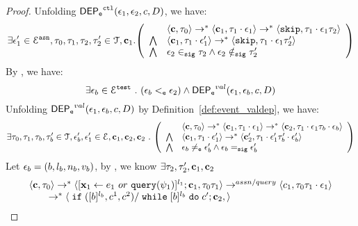 \begin{proof}
Unfolding $\mathsf{DEP_{\mathtt{e}}}^{\mathtt{{ctl}}}(\mathtt{\epsilon}_1, \mathtt{\epsilon}_2, c, D)$, we have:
\[
\exists \event_1' \in \eventset^{\asn}, \vtrace_0,
\vtrace_1, \vtrace_2, \vtrace_2' \in \mathcal{T}, \ssa{c}_1.
  \left(
  \begin{array}{ll}   
  & \config{\ssa{c}, \vtrace_0} \rightarrow^{*} 
    \config{\ssa{c}_1, \vtrace_1 \cdot \event_1}  \rightarrow^{*} 
    \config{\eskip,  \vtrace_1 \cdot \event_1 \vtrace_2} 
  \\ 
  \bigwedge &
  \config{\ssa{c}_1, \vtrace_1 \cdot \event_1'}  \rightarrow^{*} 
  \config{\eskip,  \vtrace_1 \cdot \event_1 \vtrace_2' } 
  \\
  \bigwedge &
  \event_2 \sigin \vtrace_2 \land \event_2 \notsigin \vtrace_2'
\end{array}
\right)
 \]
 By , we have:
 \[
   \exists \mathtt{\epsilon}_b\in \mathcal{E}^{\mathtt{{test}}} ~.~ (\mathtt{\epsilon}_b <_{\mathtt{e}} \mathtt{\epsilon}_2) \land \mathsf{DEP_{\mathtt{e}}}^{val}(\mathtt{\epsilon}_1, \mathtt{\epsilon}_b, c, D)
 \]
 Unfolding $\mathsf{DEP_{\mathtt{e}}}^{val}(\mathtt{\epsilon}_1, \mathtt{\epsilon}_b, c, D)$ by Definition~\ref{def:event_valdep}, we have:
\[
\exists \vtrace_0, \vtrace_1, \vtrace_b, \vtrace_b' \in \mathcal{T},  \event_b', \event_1' \in \eventset, 
\ssa{c}_1, \ssa{c}_2, \ssa{c}_2 \st
  \left(
  \begin{array}{ll}   
 & \config{\ssa{c}, \vtrace_0} \rightarrow^{*} 
  \config{\ssa{c}_1, \vtrace_1 \cdot \event_1}  \rightarrow^{*} 
  \config{\ssa{c}_2,  \vtrace_1 \cdot \event_1 \vtrace_b \cdot \event_b } 
  \\ 
  \bigwedge &
  \config{\ssa{c}_1, \vtrace_1 \cdot \event_1'}  \rightarrow^{*} 
  \config{\ssa{c}_2',  \vtrace_1 \cdot \event_1' \vtrace_b' \cdot \event_b' } 
  \\
  \bigwedge &
  \event_b \eventneq \event_b' \land \event_b \sigeq \event_b'
\end{array}
\right)
 \]
 Let $\mathtt{\epsilon}_b = (b, l_b, n_b, v_b)$, by ,
we know $\exists \mathtt{\tau}_2, \mathtt{\tau}_2', {\boldsymbol{\mathbf{c}}}_1, {\boldsymbol{\mathbf{c}}}_2$
 \[
  \begin{array}{l}   
  \langle {\boldsymbol{\mathbf{c}}}, \mathtt{\tau}_0 \rangle 
  \rightarrow^{*} 
  \langle [\mathrel{ {\boldsymbol{\mathbf{x}}}_1 \leftarrow e_1~ or ~ {\tt query}(\psi_1) }]^{l_1} ; {\boldsymbol{\mathbf{c}}}_1, \mathtt{\tau}_0 \mathtt{\tau}_1 \rangle  \rightarrow^{assn/query}
 \langle c_1, \mathtt{\tau}_0 \mathtt{\tau}_1 \cdot \mathtt{\epsilon}_1 \rangle 
  \\ 
  \qquad \rightarrow^{*} 
  \langle \;\mathtt{if}\;([b]{}^{l_b}, c^1, c^2) / \;\mathtt{while}\; [b]{}^{l_b} \;\mathtt{do}\; c'; {\boldsymbol{\mathbf{c}}}_2, 
 \rangle
\end{array}\]
\end{proof}

